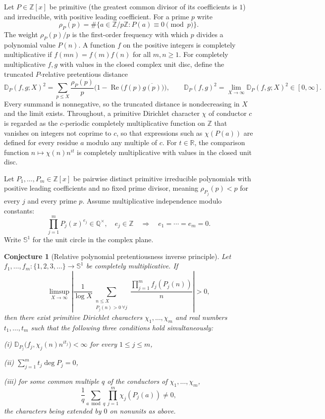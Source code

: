 \documentclass[11pt]{article}
\newtheorem{conjecture}{Conjecture}
\theoremstyle{definition}
\newcommand{\Z}{\mathbb Z}
\newcommand{\Q}{\mathbb Q}
\newcommand{\R}{\mathbb R}
\providecommand{\Z}{\mathbb Z}
\providecommand{\Q}{\mathbb Q}
\providecommand{\R}{\mathbb R}
\begin{document}
Let $P\in\Z[x]$ be primitive (the greatest common divisor of its
coefficients is $1$) and irreducible, with positive leading
coefficient.  For a prime $p$ write
\[
\rho_P(p)=\#\{a\in\Z/p\Z:P(a)\equiv0\pmod p\}.
\]
The weight $\rho_P(p)/p$ is the first-order frequency with which $p$
divides a polynomial value $P(n)$.  A function $f$ on the positive
integers is completely multiplicative if $f(mn)=f(m)f(n)$ for all
$m,n\ge1$.  For completely multiplicative $f,g$ with values in the
closed complex unit disc, define the truncated $P$-relative pretentious
distance
\[
\mathbb D_P(f,g;X)^2
=
\sum_{p\le X}\frac{\rho_P(p)}{p}
\bigl(1-\operatorname{Re}\bigl(f(p)\overline{g(p)}\bigr)\bigr),
\qquad
\mathbb D_P(f,g)^2=\lim_{X\to\infty}\mathbb D_P(f,g;X)^2\in[0,\infty].
\]
Every summand is nonnegative, so the truncated distance is
nondecreasing in $X$ and the limit exists.  Throughout, a primitive
Dirichlet character $\chi$ of conductor $c$ is regarded as the
$c$-periodic completely multiplicative function on $\Z$ that vanishes
on integers not coprime to $c$, so that expressions such as
$\chi(P(a))$ are defined for every residue $a$ modulo any multiple of
$c$.  For $t\in\R$, the comparison function $n\mapsto\chi(n)n^{it}$ is
completely multiplicative with values in the closed unit disc.

Let $P_1,\ldots,P_m\in\Z[x]$ be pairwise distinct primitive
irreducible polynomials with positive leading coefficients and no
fixed prime divisor, meaning $\rho_{P_j}(p)<p$ for every $j$ and every
prime $p$.  Assume multiplicative independence modulo constants:
\[
\prod_{j=1}^m P_j(x)^{e_j}\in\Q^\times,\quad e_j\in\Z
\quad\Longrightarrow\quad
e_1=\cdots=e_m=0.
\]
Write $\mathbb S^1$ for the unit circle in the complex plane.

\begin{conjecture}[Relative polynomial pretentiousness inverse principle]\label{t1}
Let $f_1,\ldots,f_m:\{1,2,3,\ldots\}\to\mathbb S^1$ be completely
multiplicative.  If
\[
\limsup_{X\to\infty}
\left|
\frac{1}{\log X}
\sum_{\substack{n\le X\\P_j(n)>0\ \forall j}}
\frac{\prod_{j=1}^m f_j(P_j(n))}{n}
\right|>0,
\]
then there exist primitive Dirichlet characters
$\chi_1,\ldots,\chi_m$ and real numbers $t_1,\ldots,t_m$ such that
the following three conditions hold simultaneously:

\emph{(i)} $\mathbb D_{P_j}\bigl(f_j,\chi_j(n)n^{it_j}\bigr)<\infty$
for every $1\le j\le m$,

\emph{(ii)} $\displaystyle\sum_{j=1}^m t_j\deg P_j=0$,

\emph{(iii)} for some common multiple $q$ of the conductors of
$\chi_1,\ldots,\chi_m$,
\[
\frac1q\sum_{a\bmod q}\prod_{j=1}^m\chi_j(P_j(a))\ne0,
\]
the characters being extended by $0$ on nonunits as above.

\end{conjecture}
\end{document}

